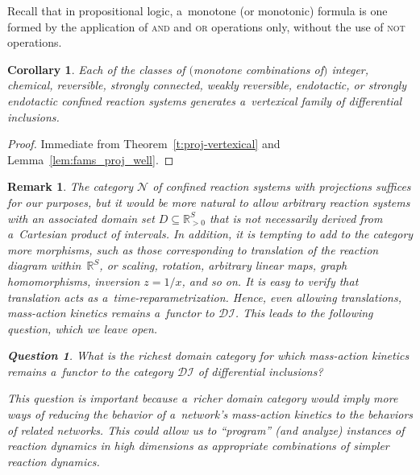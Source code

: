 \documentclass[pdftex]{sigma}
\newtheorem{Corollary}[Theorem]{Corollary}
\newtheorem{Question}[Theorem]{Question}
\newtheorem{Remark}[Theorem]{Remark}
\begin{document}
Recall that in propositional logic, a~monotone (or monotonic) formula is one formed by the application of \textsc{and}
and \textsc{or} operations only, without the use of \textsc{not} operations.{\samepage
\begin{Corollary}
\label{cor:isvertexical}
Each of the classes of $($monotone combinations of$)$ integer, chemical, reversible, strongly connected, weakly reversible,
endotactic, or strongly endotactic confined reaction systems generates a~vertexical family of differential
inclusions.
\end{Corollary}
\begin{proof}
Immediate from Theorem~\ref{t:proj-vertexical} and Lemma~\ref{lem:fams_proj_well}.
\end{proof}}

\begin{Remark}
The category $\mathcal N$ of conf\/ined reaction systems with projections suf\/f\/ices for our purposes, but it would
be more natural to allow arbitrary reaction systems with an associated domain set $D\subseteq\mathbb{R}_{>0}^S$ that is
not necessarily derived from a~Cartesian product of intervals.
In addition, it is tempting to add to the category more morphisms, such as those corresponding to translation of the
reaction diagram within~$\mathbb{R}^S$, or scaling, rotation, arbitrary linear maps, graph homomorphisms, inversion
$z=1/x$, and so on.
It is easy to verify that translation acts as a~time-reparametrization.
Hence, even allowing translations, mass-action kinetics remains a~functor to $\mathcal{DI}$.
This leads to the following question, which we leave open.
\begin{Question}
\label{qopen}
What is the richest domain category for which mass-action kinetics remains a~functor to the category $\mathcal{DI}$ of
differential inclusions?
\end{Question}

This question is important because a~richer domain category would imply more ways of reducing the behavior of
a~network's mass-action kinetics to the behaviors of related networks.
This could allow us to ``program'' (and analyze) instances of reaction dynamics in high dimensions as appropriate
combinations of simpler reaction dynamics.
\end{Remark}
\end{document}
